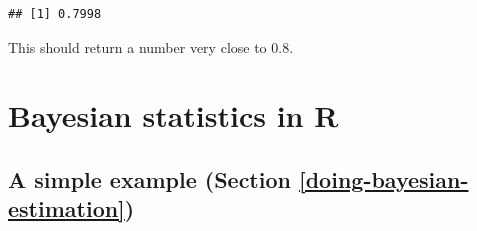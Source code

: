 \documentclass[12pt,]{book}
\begin{document}
\begin{verbatim}
## [1] 0.7998
\end{verbatim}

This should return a number very close to 0.8.

\hypertarget{bayesian-statistics-in-r}{%
\chapter{Bayesian statistics in R}\label{bayesian-statistics-in-r}}

\hypertarget{a-simple-example-section-refdoing-bayesian-estimation}{%
\section{A simple example (Section \ref{doing-bayesian-estimation})}\label{a-simple-example-section-refdoing-bayesian-estimation}}
\end{document}
